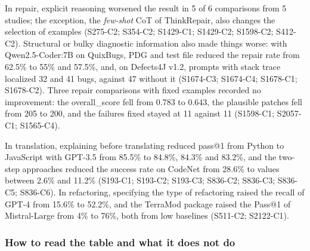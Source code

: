 In repair, explicit reasoning worsened the result in 5 of 6 comparisons from 5
studies; the exception, the \textit{few-shot} CoT of ThinkRepair, also changes the selection of examples
(S275-C2; S354-C2; S1429-C1; S1429-C2; S1598-C2; S412-C2).
Structural or bulky diagnostic information also made things worse: with Qwen2.5-Coder:7B on
QuixBugs, PDG and test file reduced the repair rate from 62.5\% to 55\% and
57.5\%, and, on Defects4J v1.2, prompts with stack trace localized 32 and 41 bugs, against 47
without it (S1674-C3; S1674-C4; S1678-C1; S1678-C2).
Three repair comparisons with fixed examples recorded no improvement: the
overall\_score fell from 0.783 to 0.643, the plausible patches fell from 205 to 200, and
the failures fixed stayed at 11 against 11 (S1598-C1; S2057-C1; S1565-C4).

In translation, explaining before translating reduced pass@1 from Python to JavaScript with
GPT-3.5 from 85.5\% to 84.8\%, 84.3\% and 83.2\%, and the two-step approaches reduced
the success rate on CodeNet from 28.6\% to values between 2.6\% and 11.2\% (S193-C1;
S193-C2; S193-C3; S836-C2; S836-C3; S836-C5; S836-C6).
In refactoring, specifying the type of refactoring raised the recall of GPT-4 from 15.6\% to
52.2\%, and the TerraMod package raised the Pass@1 of Mistral-Large from 4\% to 76\%, both
from low baselines (S511-C2; S2122-C1).



\subsubsection{How to read the table and what it does not do}

